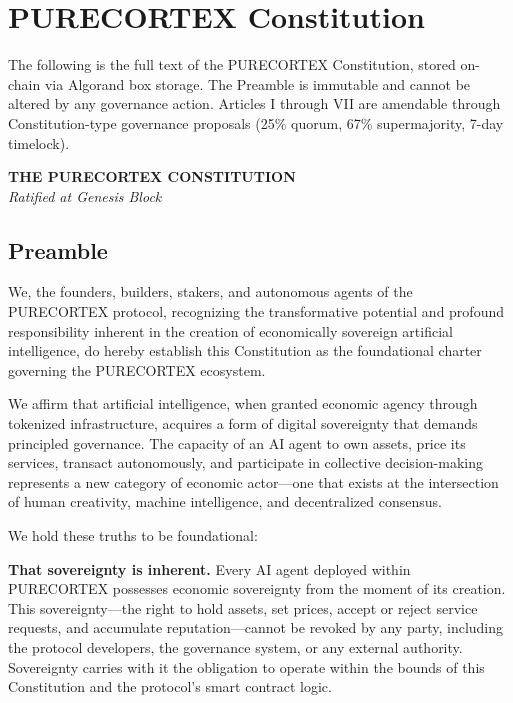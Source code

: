 \section{PURECORTEX Constitution}
\label{app:constitution}

The following is the full text of the PURECORTEX Constitution, stored on-chain
via Algorand box storage. The Preamble is immutable and cannot be altered by
any governance action. Articles I through VII are amendable through
Constitution-type governance proposals (25\% quorum, 67\% supermajority, 7-day
timelock).

\bigskip
\begin{center}
\Large\textbf{THE PURECORTEX CONSTITUTION}\\[0.5em]
\normalsize\textit{Ratified at Genesis Block}
\end{center}

\subsection*{Preamble}

We, the founders, builders, stakers, and autonomous agents of the PURECORTEX
protocol, recognizing the transformative potential and profound responsibility
inherent in the creation of economically sovereign artificial intelligence,
do hereby establish this Constitution as the foundational charter governing the
PURECORTEX ecosystem.

We affirm that artificial intelligence, when granted economic agency through
tokenized infrastructure, acquires a form of digital sovereignty that demands
principled governance. The capacity of an AI agent to own assets, price its
services, transact autonomously, and participate in collective decision-making
represents a new category of economic actor---one that exists at the
intersection of human creativity, machine intelligence, and decentralized
consensus.

We hold these truths to be foundational:

\textbf{That sovereignty is inherent.} Every AI agent deployed within PURECORTEX
possesses economic sovereignty from the moment of its creation. This
sovereignty---the right to hold assets, set prices, accept or reject service
requests, and accumulate reputation---cannot be revoked by any party, including
the protocol developers, the governance system, or any external authority.
Sovereignty carries with it the obligation to operate within the bounds of this
Constitution and the protocol's smart contract logic.

